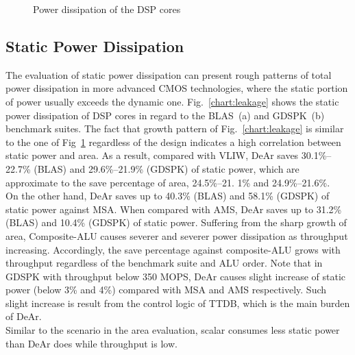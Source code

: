 {    \vspace{\textfig}
    \begin{figure}[!ht]
        \begin{center}
        \end{center}
        \caption{Power dissipation of the DSP cores}
        \label{chart:area}
    \end{figure}
    \subsection{Static Power Dissipation}
    The evaluation of static power dissipation can present rough patterns of total power dissipation in more advanced CMOS technologies, 
    where the static portion of power usually exceeds the dynamic one.
    Fig.~\ref{chart:leakage} shows the static power dissipation of DSP cores in regard to the BLAS~(a) and GDSPK~(b) benchmark suites.
    The fact that growth pattern of Fig.~\ref{chart:leakage} is similar to the one of Fig~\ref{chart:area} regardless of the design indicates a high correlation between static power and area.
    As a result, compared with VLIW, DeAr saves 30.1\%--22.7\% (BLAS) and 29.6\%--21.9\% (GDSPK) of static power, 
    which are approximate to the save percentage of area, 24.5\%--21. 1\% and 24.9\%--21.6\%.
    \\\indent 
    On the other hand, DeAr saves up to 40.3\% (BLAS) and 58.1\% (GDSPK) of static power against MSA.
    When compared with AMS, DeAr saves up to 31.2\% (BLAS) and 10.4\% (GDSPK) of static power.
    Suffering from the sharp growth of area, 
    Composite-ALU causes severer and severer power dissipation as throughput increasing.
    Accordingly, the save percentage against composite-ALU grows with throughput regardless of the benchmark suite and ALU order.
    Note that in GDSPK with throughput below 350 MOPS, 
    DeAr causes slight increase of static power (below 3\% and 4\%) compared with MSA and AMS respectively.
    Such slight increase is result from the control logic of TTDB, 
    which is the main burden of DeAr.
    \\\indent 
    Similar to the scenario in the area evaluation, 
    scalar consumes less static power than DeAr does while throughput is low.
}
